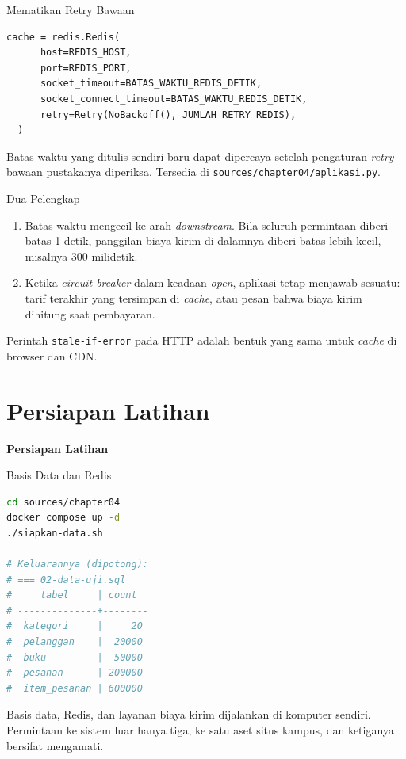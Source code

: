 \documentclass[aspectratio=169, table, 12pt]{beamer}
\begin{document}
\begin{frame}[fragile]{{\Large Mematikan Retry Bawaan}}
  \vspace{4pt}
\begin{lstlisting}[style=PythonStyle]
  cache = redis.Redis(
      host=REDIS_HOST,
      port=REDIS_PORT,
      socket_timeout=BATAS_WAKTU_REDIS_DETIK,
      socket_connect_timeout=BATAS_WAKTU_REDIS_DETIK,
      retry=Retry(NoBackoff(), JUMLAH_RETRY_REDIS),
  )
\end{lstlisting}

  \vspace{4pt}
  {\footnotesize Batas waktu yang ditulis sendiri baru dapat dipercaya setelah
  pengaturan \textit{retry} bawaan pustakanya diperiksa. Tersedia di
  \texttt{sources/chapter04/aplikasi.py}.}
\end{frame}

\begin{frame}{{\Large Dua Pelengkap}}
  \vspace{10pt}
  \begin{enumerate}
    \item Batas waktu mengecil ke arah \textit{downstream}. Bila seluruh permintaan diberi
          batas 1 detik, panggilan biaya kirim di dalamnya diberi batas lebih
          kecil, misalnya 300 milidetik.
    \item Ketika \textit{circuit breaker} dalam keadaan \textit{open}, aplikasi tetap menjawab sesuatu: tarif
          terakhir yang tersimpan di \textit{cache}, atau pesan bahwa biaya
          kirim dihitung saat pembayaran.
  \end{enumerate}
  \vspace{8pt}
  {\footnotesize Perintah \texttt{stale-if-error} pada HTTP adalah bentuk yang
  sama untuk \textit{cache} di browser dan CDN.}
\end{frame}

\section{Persiapan Latihan}

\begin{frame}{\hfill}
  \centering
  \Huge{\textbf{Persiapan Latihan}}
\end{frame}

\begin{frame}[fragile]{{\Large Basis Data dan Redis}}
  \vspace{2pt}
\begin{lstlisting}[language=bash]
cd sources/chapter04
docker compose up -d
./siapkan-data.sh

# Keluarannya (dipotong):
# === 02-data-uji.sql
#     tabel     | count
# --------------+--------
#  kategori     |     20
#  pelanggan    |  20000
#  buku         |  50000
#  pesanan      | 200000
#  item_pesanan | 600000
\end{lstlisting}

  \vspace{2pt}
  {\footnotesize Basis data, Redis, dan layanan biaya kirim dijalankan di
  komputer sendiri. Permintaan ke sistem luar hanya tiga, ke satu aset situs
  kampus, dan ketiganya bersifat mengamati.}
\end{frame}
\end{document}
